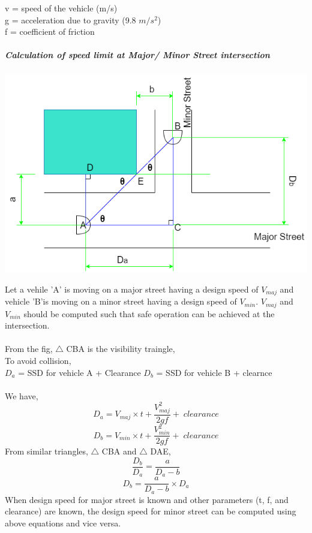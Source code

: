 \hspace*{10mm}v = speed of the vehicle (m/s)\\
\hspace*{10mm}g = acceleration due to gravity (9.8 $ m/s^2 $)\\
\hspace*{10mm}f = coefficient of friction
\subparagraph{Calculation of speed limit at Major/ Minor Street intersection}
\begin{center}
	\includegraphics[scale=0.5]{gfx/ssd.png}
\end{center}
Let a vehile 'A' is moving on a major street having a design speed of $ V_{maj} $ and vehicle 'B'is moving on a minor street having a design speed of $ V_{min} $. $ V_{maj} $ and $ V_{min} $ should be computed such that safe operation can be achieved at the intersection.\\\\
From the fig, $ \bigtriangleup $ CBA is the visibility traingle,\\
To avoid collision,\\
$ D_a $ = SSD for vehicle A + Clearance
$ D_b $ = SSD for vehicle B + clearnce\\\\
We have,
\begin{equation}
	D_a = V_{maj} \times t + \frac{V_{maj}^2}{2gf} + \; clearance
\end{equation}
\begin{equation}
	D_b = V_{min} \times t + \frac{V_{min}^2}{2gf} + \; clearance
\end{equation}
From similar triangles, $ \bigtriangleup $ CBA and $ \bigtriangleup $ DAE,
\begin{equation}
	\frac{D_b}{D_a} = \frac{a}{D_a - b}
\end{equation}
\begin{equation}
	D_b = \frac{a}{D_a - b} \times D_a
\end{equation}
When design speed for major street is known and other parameters (t, f, and clearance) are known, the design speed for minor street can be computed using above equations and vice versa.
